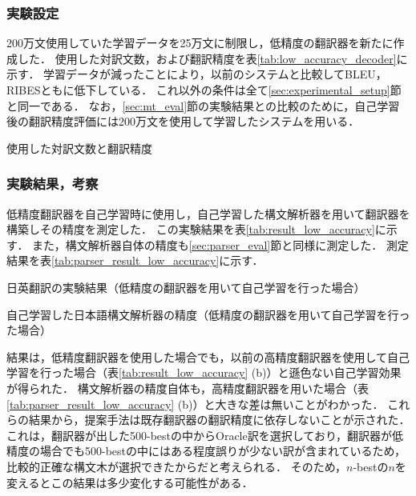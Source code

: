 \documentclass[japanese]{jnlp_1.4}
\begin{document}
\subsubsection{実験設定}

200万文使用していた学習データを25万文に制限し，低精度の翻訳器を新たに作成した．
使用した対訳文数，および翻訳精度を表\ref{tab:low_accuracy_decoder}に示す．
学習データが減ったことにより，以前のシステムと比較してBLEU，RIBESともに低下している．
これ以外の条件は全て\ref{sec:experimental_setup}節と同一である．
なお，\ref{sec:mt_eval}節の実験結果との比較のために，自己学習後の翻訳精度評価には200万文を使用して学習したシステムを用いる．

\begin{table}[t] 
\caption{使用した対訳文数と翻訳精度}
\label{tab:low_accuracy_decoder}

\end{table}


\subsubsection{実験結果，考察}

低精度翻訳器を自己学習時に使用し，自己学習した構文解析器を用いて翻訳器を構築しその精度を測定した．
この実験結果を表\ref{tab:result_low_accuracy}に示す．
また，構文解析器自体の精度も\ref{sec:parser_eval}節と同様に測定した．
測定結果を表\ref{tab:parser_result_low_accuracy}に示す．

\begin{table}[t] 
\caption{日英翻訳の実験結果（低精度の翻訳器を用いて自己学習を行った場合）}
\label{tab:result_low_accuracy}

\end{table}
\begin{table}[t]
\caption{自己学習した日本語構文解析器の精度（低精度の翻訳器を用いて自己学習を行った場合）}
\label{tab:parser_result_low_accuracy}

\end{table}

結果は，低精度翻訳器を使用した場合でも，以前の高精度翻訳器を使用して自己学習を行った場合（表\ref{tab:result_low_accuracy} (b)）と遜色ない自己学習効果が得られた．
構文解析器の精度自体も，高精度翻訳器を用いた場合（表\ref{tab:parser_result_low_accuracy} (b)）と大きな差は無いことがわかった．
これらの結果から，提案手法は既存翻訳器の翻訳精度に依存しないことが示された．
これは，翻訳器が出した500-bestの中からOracle訳を選択しており，翻訳器が低精度の場合でも500-bestの中にはある程度誤りが少ない訳が含まれているため，比較的正確な構文木が選択できたからだと考えられる．
そのため，$n$-bestの$n$を変えるとこの結果は多少変化する可能性がある．
\end{document}
